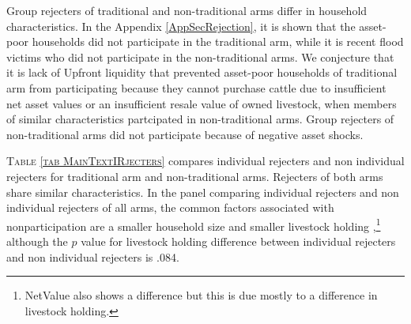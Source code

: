 	Group rejecters of \textsf{traditional} and non-\textsf{traditional} arms differ in household characteristics. In the Appendix \ref{AppSecRejection}, it is shown that the asset-poor households did not participate in the \textsf{traditional} arm, while it is recent flood victims who did not participate in the non-\textsf{traditional} arms. We conjecture that it is lack of \textsf{Upfront} liquidity that prevented asset-poor households of \textsf{traditional} arm from participating because they cannot purchase cattle due to insufficient net asset values or an insufficient resale value of owned livestock, when members of similar characteristics partcipated in non-\textsf{traditional} arms. Group rejecters of non-\textsf{traditional} arms did not participate because of negative asset shocks. %

	\textsc{\normalsize Table \ref{tab MainTextIRjecters}} compares individual rejecters and non individual rejecters for \textsf{traditional} arm and non-\textsf{traditional} arms. Rejecters of both arms share similar characteristics. %
	In the panel comparing individual rejecters and non individual rejecters of all arms, the common factors associated with nonparticipation are a smaller household size and smaller livestock holding%
	,\footnote{\textsf{NetValue} also shows a difference but this is due mostly to a difference in livestock holding. } although the $p$ value for livestock holding difference between individual rejecters and non individual rejecters is .084.

